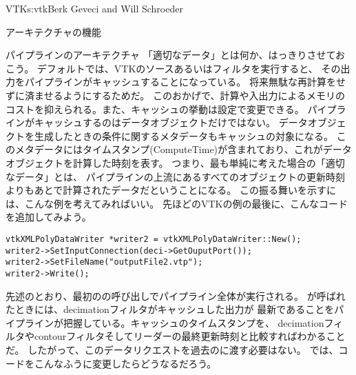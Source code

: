 \begin{aosachapter}{VTK}{s:vtk}{Berk Geveci and Will Schroeder}
\begin{aosasect1}{アーキテクチャの機能}
\begin{aosasect2}{パイプラインのアーキテクチャ}
「適切なデータ」とは何か、はっきりさせておこう。
デフォルトでは、VTKのソースあるいはフィルタを実行すると、
その出力をパイプラインがキャッシュすることになっている。
将来無駄な再計算をせずに済ませるようにするためだ。
このおかげで、計算や入出力によるメモリのコストを抑えられる。また、キャッシュの挙動は設定で変更できる。
パイプラインがキャッシュするのはデータオブジェクトだけではない。
データオブジェクトを生成したときの条件に関するメタデータもキャッシュの対象になる。
このメタデータにはタイムスタンプ(ComputeTime)が含まれており、これがデータオブジェクトを計算した時刻を表す。
つまり、最も単純に考えた場合の「適切なデータ」とは、
パイプラインの上流にあるすべてのオブジェクトの更新時刻よりもあとで計算されたデータだということになる。
この振る舞いを示すには、こんな例を考えてみればいい。
先ほどのVTKの例の最後に、こんなコードを追加してみよう。

\begin{verbatim}
vtkXMLPolyDataWriter *writer2 = vtkXMLPolyDataWriter::New();
writer2->SetInputConnection(deci->GetOuputPort());
writer2->SetFileName("outputFile2.vtp");
writer2->Write();
\end{verbatim}

先述のとおり、最初のの呼び出しでパイプライン全体が実行される。
が呼ばれたときには、decimationフィルタがキャッシュした出力が
最新であることをパイプラインが把握している。キャッシュのタイムスタンプを、
decimationフィルタやcontourフィルタそしてリーダーの最終更新時刻と比較すればわかることだ。
したがって、このデータリクエストを過去のに渡す必要はない。
では、コードをこんなふうに変更したらどうなるだろう。


\end{aosasect2}
\end{aosasect1}
\end{aosachapter}
